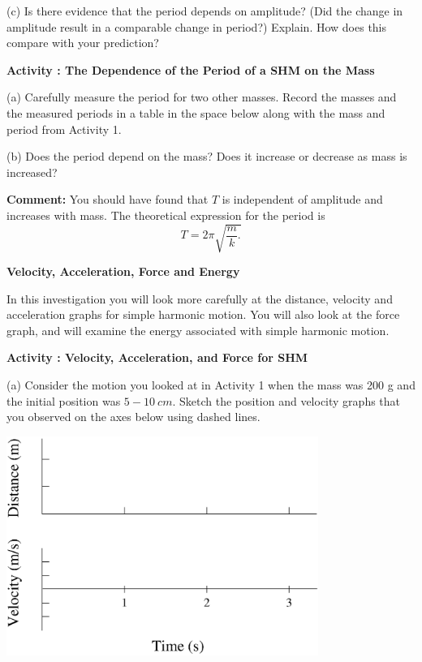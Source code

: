 (c) Is there evidence that the period depends on amplitude? (Did the change
in amplitude result in a comparable change in period?) Explain. How does this
compare with your prediction?
\vspace{20mm}

\newpage

\textbf{Activity  : The Dependence of the Period of a SHM on the Mass} 

(a) Carefully measure the period for two other masses. Record the masses and
the measured periods in a table in the space below along with the mass and period from Activity 1.
\vspace{30mm}

(b) Does the period depend on the mass? Does it increase or decrease as mass
is increased?
\vspace{20mm}

\textbf{Comment:} You should have found that $T$ is independent of amplitude and increases with mass. 
The theoretical expression for the period is
\[T=2\pi \sqrt{\frac{m}{k}.}\]


\textbf{Velocity, Acceleration, Force and Energy }

In this investigation you will look more carefully at the distance, velocity
and acceleration graphs for simple harmonic motion. You will also look at the
force graph, and will examine the energy associated with simple harmonic motion.

\textbf{Activity  : Velocity, Acceleration, and Force for SHM} 

(a) Consider the motion you looked at in Activity 1 when the mass was 200 g
and the initial position was $5-10~ cm$. Sketch the position and velocity graphs
that you observed on the axes below using dashed lines.

\vspace{0.3cm}
{\par\centering \includegraphics[width=4.0in]{periodic_motion/periodic_motion_fig1b.eps} \par}
\vspace{0.3cm}

